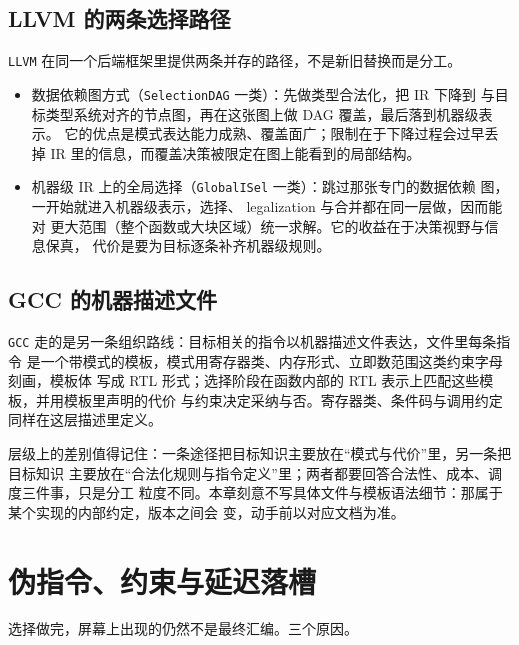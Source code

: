 \documentclass[12pt,a4paper,fontset=fandol]{ctexbook}
\newcommand{\Tool}[1]{\texttt{#1}}
\newcommand{\Mx}[1]{\textsf{#1}}
\begin{document}
\subsection{LLVM 的两条选择路径}\label{sec:cl06-llvm-two}

\Tool{LLVM} 在同一个后端框架里提供两条并存的路径，不是新旧替换而是分工。

\begin{itemize}
  \item 数据依赖图方式（\Tool{SelectionDAG} 一类）：先做类型合法化，把 \Mx{IR} 下降到
        与目标类型系统对齐的节点图，再在这张图上做 DAG 覆盖，最后落到机器级表示。
        它的优点是模式表达能力成熟、覆盖面广；限制在于下降过程会过早丢掉 \Mx{IR}
        里的信息，而覆盖决策被限定在图上能看到的局部结构。
  \item 机器级 \Mx{IR} 上的全局选择（\Tool{GlobalISel} 一类）：跳过那张专门的数据依赖
        图，一开始就进入机器级表示，选择、 legalization 与合并都在同一层做，因而能对
        更大范围（整个函数或大块区域）统一求解。它的收益在于决策视野与信息保真，
        代价是要为目标逐条补齐机器级规则。
\end{itemize}

\subsection{GCC 的机器描述文件}\label{sec:cl06-gccmd}

\Tool{GCC} 走的是另一条组织路线：目标相关的指令以机器描述文件表达，文件里每条指令
是一个带模式的模板，模式用寄存器类、内存形式、立即数范围这类约束字母刻画，模板体
写成 RTL 形式；选择阶段在函数内部的 RTL 表示上匹配这些模板，并用模板里声明的代价
与约束决定采纳与否。寄存器类、条件码与调用约定同样在这层描述里定义。

层级上的差别值得记住：一条途径把目标知识主要放在“模式与代价”里，另一条把目标知识
主要放在“合法化规则与指令定义”里；两者都要回答合法性、成本、调度三件事，只是分工
粒度不同。本章刻意不写具体文件与模板语法细节：那属于某个实现的内部约定，版本之间会
变，动手前以对应文档为准。

\section{伪指令、约束与延迟落槽}\label{sec:cl06-pseudo}

选择做完，屏幕上出现的仍然不是最终汇编。三个原因。
\end{document}
